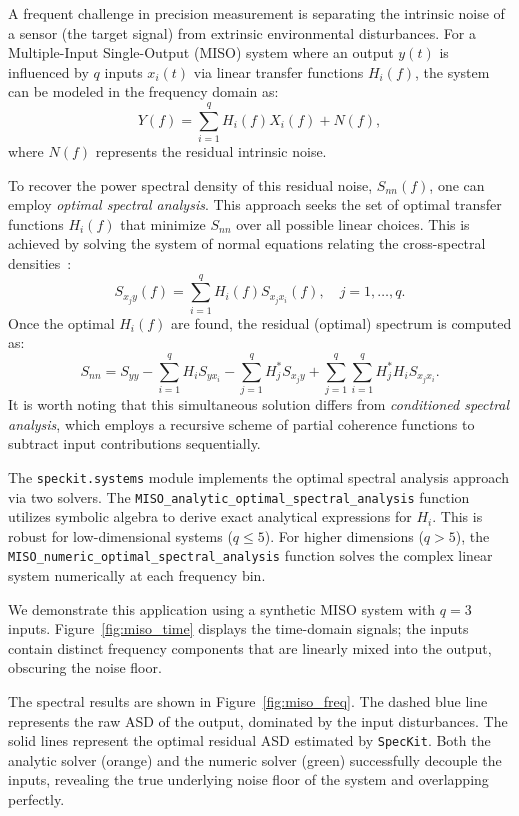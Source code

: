 \documentclass[final, 5p, times, twocolumn, number, sort&compress]{elsarticle}
\newcommand{\speckit}{\texttt{SpecKit}}
\begin{document}
A frequent challenge in precision measurement is separating the intrinsic noise of a sensor (the target signal) from extrinsic environmental disturbances. For a Multiple-Input Single-Output (MISO) system where an output $y(t)$ is influenced by $q$ inputs $x_i(t)$ via linear transfer functions $H_i(f)$, the system can be modeled in the frequency domain as:
\begin{equation}
    Y(f) = \sum_{i=1}^{q} H_i(f) X_i(f) + N(f),
\end{equation}
where $N(f)$ represents the residual intrinsic noise.

To recover the power spectral density of this residual noise, $S_{nn}(f)$, one can employ \textit{optimal spectral analysis}. This approach seeks the set of optimal transfer functions $H_i(f)$ that minimize $S_{nn}$ over all possible linear choices. This is achieved by solving the system of normal equations relating the cross-spectral densities~\cite{Nofrarias2013, BendatPiersol}:
\begin{equation}
    S_{x_j y}(f) = \sum_{i=1}^q H_i(f) S_{x_j x_i}(f), \quad j = 1, \dots, q.
\end{equation}
Once the optimal $H_i(f)$ are found, the residual (optimal) spectrum is computed as:
\begin{equation}
    S_{nn} = S_{yy} - \sum_{i=1}^q H_i S_{y x_i} - \sum_{j=1}^q H_j^* S_{x_j y} + \sum_{j=1}^q \sum_{i=1}^q H_j^* H_i S_{x_j x_i}.
\end{equation}
It is worth noting that this simultaneous solution differs from \textit{conditioned spectral analysis}, which employs a recursive scheme of partial coherence functions to subtract input contributions sequentially.

The \texttt{speckit.systems} module implements the optimal spectral analysis approach via two solvers. The \texttt{MISO\_analytic\_optimal\_spectral\_analysis} function utilizes symbolic algebra to derive exact analytical expressions for $H_i$. This is robust for low-dimensional systems ($q \le 5$). For higher dimensions ($q > 5$), the \texttt{MISO\_numeric\_optimal\_spectral\_analysis} function solves the complex linear system numerically at each frequency bin.

We demonstrate this application using a synthetic MISO system with $q=3$ inputs. Figure~\ref{fig:miso_time} displays the time-domain signals; the inputs contain distinct frequency components that are linearly mixed into the output, obscuring the noise floor.

The spectral results are shown in Figure~\ref{fig:miso_freq}. The dashed blue line represents the raw ASD of the output, dominated by the input disturbances. The solid lines represent the optimal residual ASD estimated by \speckit{}. Both the analytic solver (orange) and the numeric solver (green) successfully decouple the inputs, revealing the true underlying noise floor of the system and overlapping perfectly.
\end{document}
